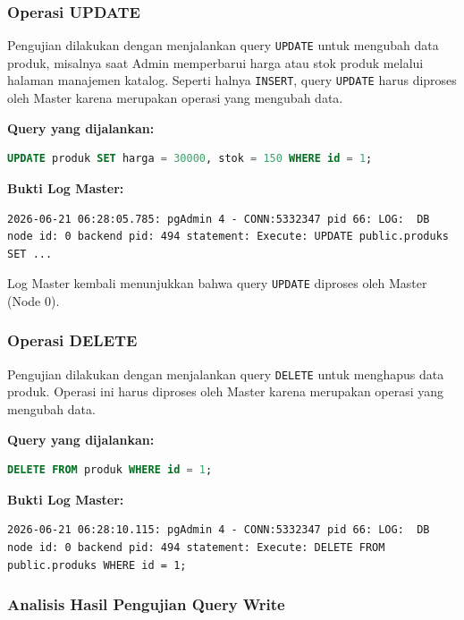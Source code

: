 \subsubsection{Operasi UPDATE}

Pengujian dilakukan dengan menjalankan query \texttt{UPDATE} untuk
mengubah data produk, misalnya saat Admin memperbarui harga atau stok
produk melalui halaman manajemen katalog. Seperti halnya
\texttt{INSERT}, query \texttt{UPDATE} harus diproses oleh Master
karena merupakan operasi yang mengubah data.

\textbf{Query yang dijalankan:}
\begin{lstlisting}[language=SQL, caption={Query UPDATE: Mengubah Data Produk}]
UPDATE produk SET harga = 30000, stok = 150 WHERE id = 1;
\end{lstlisting}

\textbf{Bukti Log Master:}
\begin{lstlisting}[caption={Log PostgreSQL Master: Query UPDATE}, label={lst:log-update}]
2026-06-21 06:28:05.785: pgAdmin 4 - CONN:5332347 pid 66: LOG:  DB node id: 0 backend pid: 494 statement: Execute: UPDATE public.produks SET ...
\end{lstlisting}

Log Master kembali menunjukkan bahwa query \texttt{UPDATE} diproses
oleh Master (Node 0).

\subsubsection{Operasi DELETE}

Pengujian dilakukan dengan menjalankan query \texttt{DELETE} untuk
menghapus data produk. Operasi ini harus diproses oleh Master
karena merupakan operasi yang mengubah data.

\textbf{Query yang dijalankan:}
\begin{lstlisting}[language=SQL, caption={Query DELETE: Menghapus Data Produk}]
DELETE FROM produk WHERE id = 1;
\end{lstlisting}

\textbf{Bukti Log Master:}
\begin{lstlisting}[caption={Log PostgreSQL Master: Query DELETE}, label={lst:log-delete}]
2026-06-21 06:28:10.115: pgAdmin 4 - CONN:5332347 pid 66: LOG:  DB node id: 0 backend pid: 494 statement: Execute: DELETE FROM public.produks WHERE id = 1;
\end{lstlisting}

\subsubsection{Analisis Hasil Pengujian Query Write}

